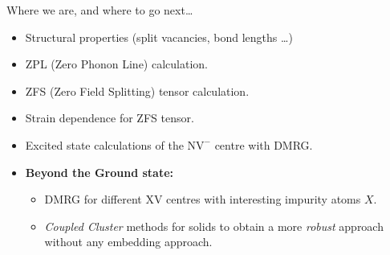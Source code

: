 
\begin{frame}{Where we are, and where to go next\ldots} %
  \begin{itemize}
    \item
      Structural properties (split vacancies, bond lengths \ldots)
    \item
      ZPL (Zero Phonon Line) calculation.
    \item
      ZFS (Zero Field Splitting) tensor calculation.
    \item
      Strain dependence for ZFS tensor.
    \item
      Excited state calculations of the $ \mathrm{NV}^{-} $ centre with DMRG\@.
    \item
      \textbf{Beyond the Ground state:}\\
      \begin{itemize}
        \item
          DMRG for different $ \mathrm{XV} $ centres with interesting impurity
          atoms $ X $.
        \item
          \textit{Coupled Cluster} methods for solids to obtain a more
          \textit{robust} approach without any embedding approach.
      \end{itemize}
  \end{itemize}
\end{frame}
